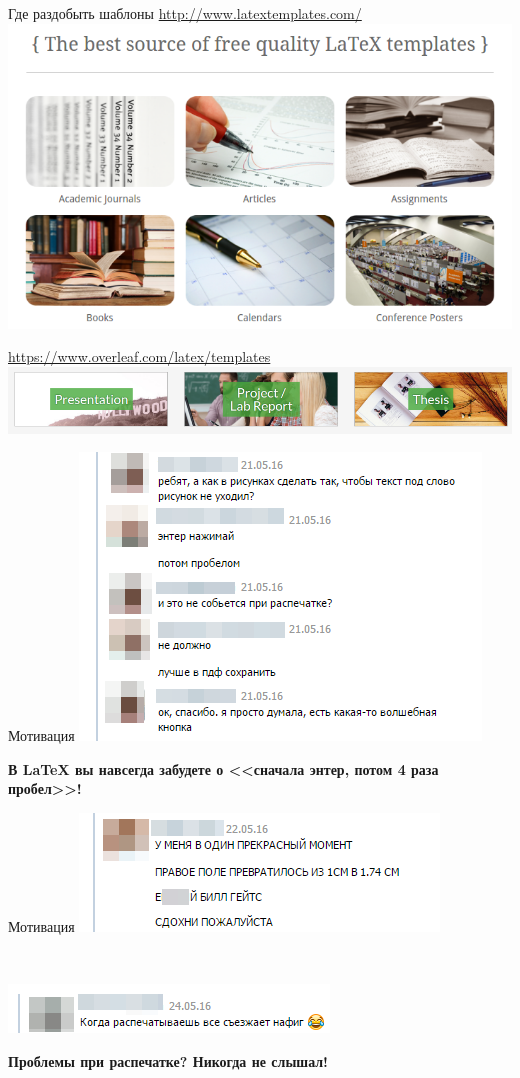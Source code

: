 \documentclass[newPxFont]{beamer}
\begin{document}
\begin{frame}{Где раздобыть шаблоны}
\centering
\url{http://www.latextemplates.com/}
\includegraphics[width=0.6\linewidth]{template1.png}	

\url{https://www.overleaf.com/latex/templates}
\includegraphics[width=\linewidth]{template2.png}	
\end{frame}


\begin{frame}{Мотивация}
    \centering
    \includegraphics[height=0.6\textheight]{m6.png}
    
    \vfill
    \alert{\textbf{В \LaTeX{} вы навсегда забудете о <<сначала энтер, потом 4 раза пробел>>!}}
\end{frame}


\begin{frame}{Мотивация}
    \centering
    \includegraphics[scale=0.5]{m7.png}

	\mbox{ }     
     
    \includegraphics[scale=0.6]{m9.png}
    
    \vfill
    \alert{\textbf{Проблемы при распечатке? Никогда не слышал!}}
\end{frame}
\end{document}
